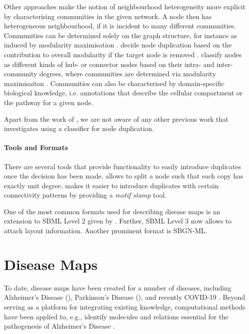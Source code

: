 \documentclass[
	fontsize=10pt, %
	twoside=false, %
	secnumdepth=1, %
]{kaobook}
\begin{document}
Other approaches make the notion of neighbourhood heterogeneity more explicit by
characterising communities in the given network. A node then has heterogeneous
neighbourhood, if it is incident to many different communities. Communities can
be determined solely on the graph structure, for instance as induced by
modularity maximisation \cite{newman_modularity_2006}.
\citeauthor{huss_CurrencyCommodityMetabolites_2007} decide node duplication
based on the contribution to overall modularity if the target node is removed
\cite{huss_CurrencyCommodityMetabolites_2007}.
\citeauthor{guimera_FunctionalCartographyComplex_2005} classify nodes as
different kinds of hub- or connector nodes based on their intra- and
inter-community degrees, where communities are determined via modularity maximisaiton
\cite{guimera_FunctionalCartographyComplex_2005}. Communities can also be
characterised by domain-specific biological knowledge, i.e. annotations that
describe the cellular compartment \cite{manipur_clustering_2020} or the pathway 
\cite{rohrschneider_NovelGridBasedVisualization_2010}
\cite{joshi-tope_ReactomeKnowledgebaseBiological_2005} for a given node.

Apart from the work of \citeauthor{nielsen_MachineLearningSupport_2019}, we are
not aware of any other previous work that investigates using a classifier for
node duplication.



\paragraph{Tools and Formats}
There are several tools that
provide functionality to easily introduce duplicates once the decision has been
made.
 \cite{villeger_ArcadiaVisualizationTool_2010}
allows to split a node such that each copy has exactly unit degree.
 \cite{droste_OmixVisualizationTool_2013} makes it easier to
introduce duplicates with certain connectivity patterns by providing a
\textit{motif stamp} tool.

One of the most common formats used for describing disease maps is an extension to SBML
Level 2 given by . Further, SBML Level 3 now allows to attach
layout information. Another prominent format is SBGN-ML.


\section{Disease Maps}
To date, disease maps have been created for a number of diseases, including
Alzheimer's Disease (\alzpathway \cite{ogishima_AlzPathwayUpdatedMap_2016}),
Parkinson's Disease (\pdmap \cite{fujita_IntegratingPathwaysParkinson_2014}),
and recently \textsc{COVID-19}
\cite{ostaszewski_COVID19DiseaseMap_2020}. Beyond serving as a platform for
integrating existing knowledge, computational methods have been applied to,
e.g., identify molecules and relations essential for the pathogenesis of Alzheimer's
Disease \cite{mizuno_NetworkAnalysisComprehensive_2016}.
\end{document}
